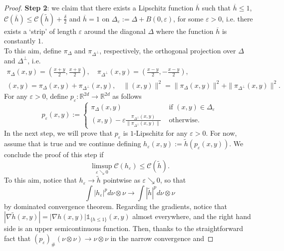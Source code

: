 \documentclass[10pt,a4paper]{amsart}
\newcommand{\R}{\mathbb{R}}
\begin{document}
\begin{proof}
    \textbf{Step 2}: we claim that there exists a Lipschitz function $\overline{h}$ such that $\overline{h}\leq 1$, $\mathcal{C}(\overline{h})\leq \mathcal{C}(\tilde{h}) + \frac{\delta}{2}$ and $\overline{h} = 1$ on $\Delta_{\varepsilon}:= \Delta+B(0,\varepsilon)$, for some $\varepsilon>0$, i.e. there exists a `strip' of length $\varepsilon$ around the diagonal $\Delta$ where the function $\overline{h}$ is constantly $1$.
    \\
    To this aim, define $\pi_\Delta$ and $\pi_{\Delta^\perp}$, respectively, the orthogonal projection over $\Delta$ and $\Delta^\perp$, i.e. 
    \begin{align*}
        \pi_\Delta(x,y) = \left(\frac{x+y}{2}, \frac{x+y}{2}\right), \quad \pi_{\Delta^\perp}(x,y) = \left( \frac{x-y}{2}, - \frac{x-y}{2} \right), \\
        (x,y) = \pi_\Delta(x,y) + \pi_{\Delta^\perp}(x,y), \quad \|(x,y)\|^2 = \|\pi_\Delta(x,y)\|^2 + \|\pi_{\Delta^\perp}(x,y)\|^2.
    \end{align*}
    For any $\varepsilon>0$, define $p_\varepsilon:\R^{2d}\to \R^{2d}$ as follows 
    \begin{equation}
        p_\varepsilon(x,y) := \begin{cases}
            \pi_{\Delta}(x,y) \quad & \text{ if } (x,y) \in \Delta_\varepsilon
            \\
            (x,y) - \varepsilon \frac{\pi_{\Delta^\perp}(x,y)}{\|\pi_{\Delta^\perp}(x,y)\|} & \text{ otherwise}.
        \end{cases}
    \end{equation}
    In the next step, we will prove that $p_\varepsilon$ is $1$-Lipschitz for any $\varepsilon>0$. For now, assume that is true and we continue defining $h_\varepsilon(x,y) := \tilde{h}(p_\varepsilon(x,y))$. 
    We conclude the proof of this step if 
    \[\limsup_{\varepsilon\searrow 0} \mathcal{C}(h_\varepsilon)\leq \mathcal{C}(\tilde{h}).\]
    To this aim, notice that $h_\varepsilon \to \tilde{h}$ pointwise as $\varepsilon \searrow 0$, so that 
    \[\int |h_\varepsilon|^p d\nu\otimes \nu \to \int|\tilde{h}|^p d\nu\otimes \nu\]
    by dominated convergence theorem. Regarding the gradients, notice that $|\nabla \tilde{h}(x,y)|=  |\nabla h(x,y)| \mathds{1}_{\{ h\leq 1\} }(x,y)$ almost everywhere, and the right hand side is an upper semicontinuous function. Then, thanks to the straightforward fact that $(p_\varepsilon)_\#(\nu\otimes \nu) \to \nu\otimes \nu$ in the narrow convergence and 

\end{proof}
\end{document}
